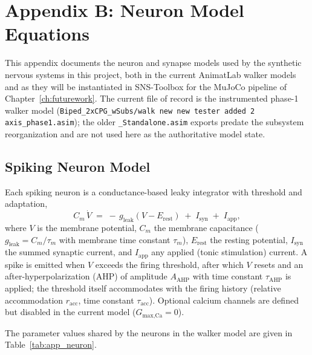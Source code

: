 \chapter{Appendix B: Neuron Model Equations}\label{app:neuron_equations}



This appendix documents the neuron and synapse models used by the synthetic nervous systems in this project, both in the current AnimatLab walker models and as they will be instantiated in SNS-Toolbox for the MuJoCo pipeline of Chapter~\ref{ch:futurework}. The current file of record is the instrumented phase-1 walker model (\texttt{Biped\_2xCPG\_wSubs/walk new new tester added 2 axis\_phase1.asim}); the older \texttt{\_Standalone.asim} exports predate the subsystem reorganization and are not used here as the authoritative model state.

\section{Spiking Neuron Model}

Each spiking neuron is a conductance-based leaky integrator with threshold and adaptation,
\begin{equation}
    C_{m}\,\dot{V} \;=\; -\,g_{\text{leak}}\left(V - E_{\text{rest}}\right)
                      \;+\; I_{\text{syn}} \;+\; I_{\text{app}},
    \label{eq:app_membrane}
\end{equation}
where $V$ is the membrane potential, $C_{m}$ the membrane capacitance ($g_{\text{leak}} = C_{m}/\tau_{m}$ with membrane time constant $\tau_{m}$), $E_{\text{rest}}$ the resting potential, $I_{\text{syn}}$ the summed synaptic current, and $I_{\text{app}}$ any applied (tonic stimulation) current. A spike is emitted when $V$ exceeds the firing threshold, after which $V$ resets and an after-hyperpolarization (AHP) of amplitude $A_{\text{AHP}}$ with time constant $\tau_{\text{AHP}}$ is applied; the threshold itself accommodates with the firing history (relative accommodation $r_{\text{acc}}$, time constant $\tau_{\text{acc}}$). Optional calcium channels are defined but disabled in the current model ($G_{\text{max,Ca}} = 0$).

The parameter values shared by the neurons in the walker model are given in Table~\ref{tab:app_neuron}.

